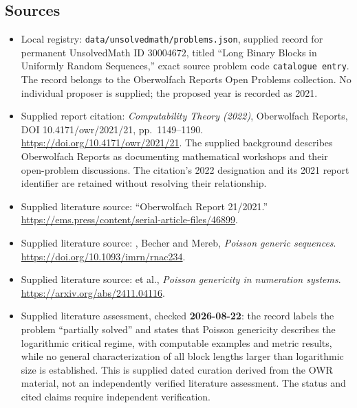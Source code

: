\documentclass[11pt]{article}
\begin{document}
\subsection{Sources}
\begin{itemize}
\item Local registry: \texttt{data/unsolvedmath/problems.json}, supplied record for permanent UnsolvedMath ID \(30004672\), titled ``Long Binary Blocks in Uniformly Random Sequences,'' exact source problem code \texttt{catalogue entry}. The record belongs to the Oberwolfach Reports Open Problems collection. No individual proposer is supplied; the proposed year is recorded as 2021.
\item Supplied report citation: \emph{Computability Theory (2022)}, Oberwolfach Reports, DOI 10.4171/owr/2021/21, pp.\ 1149--1190. \url{https://doi.org/10.4171/owr/2021/21}. The supplied background describes Oberwolfach Reports as documenting mathematical workshops and their open-problem discussions. The citation's 2022 designation and its 2021 report identifier are retained without resolving their relationship.
\item Supplied literature source: ``Oberwolfach Report 21/2021.'' \url{https://ems.press/content/serial-article-files/46899}.
\item Supplied literature source: , Becher and Mereb, \emph{Poisson generic sequences}. \url{https://doi.org/10.1093/imrn/rnac234}.
\item Supplied literature source:  et al., \emph{Poisson genericity in numeration systems}. \url{https://arxiv.org/abs/2411.04116}.
\item Supplied literature assessment, checked \textbf{2026-08-22}: the record labels the problem ``partially solved'' and states that Poisson genericity describes the logarithmic critical regime, with computable examples and metric results, while no general characterization of all block lengths larger than logarithmic size is established. This is supplied dated curation derived from the OWR material, not an independently verified literature assessment. The status and cited claims require independent verification.
\end{itemize}
\end{document}
